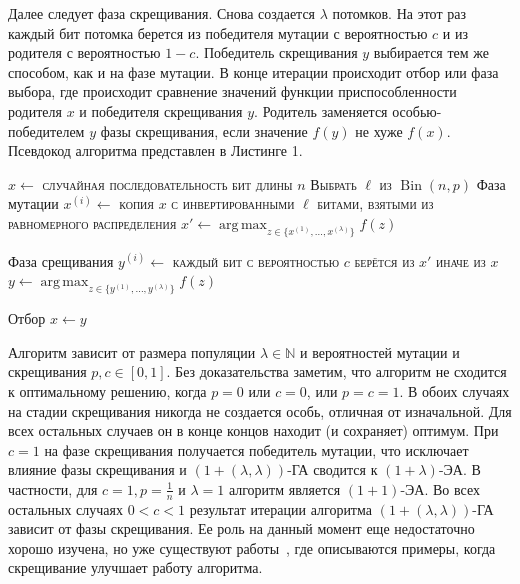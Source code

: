 \documentclass[times]{itmo-student-thesis}
\newcommand{\alglambdaf}{${(1 + (\lambda , \lambda))}$-ГА\xspace}
\newcommand{\oea}{\mbox{$(1 + 1)$-ЭА}\xspace}
\newcommand{\oplea}{\mbox{$(1+\lambda)$-ЭА}\xspace}
\newcommand{\N}{{\mathbb N}}
\DeclareMathOperator{\Bin}{Bin}
\DeclareMathOperator*{\argmax}{arg\,max}
\begin{document}
Далее следует фаза скрещивания. Снова создается $\lambda$ потомков. На этот раз каждый бит потомка берется из победителя мутации с вероятностью $c$ и из родителя с вероятностью $1 - c$. Победитель скрещивания $y$ выбирается тем же способом, как и на фазе мутации. В конце итерации происходит отбор или фаза выбора, где происходит сравнение значений функции приспособленности родителя $x$ и победителя скрещивания $y$.
Родитель заменяется особью-победителем $y$ фазы скрещивания, если значение $f(y)$ не хуже $f(x)$. Псевдокод алгоритма представлен в Листинге 1.

\begin{algorithm}[h]
\caption{Псевдокод \alglambdaf, максимизируещего $f$}\label{ollgaMin}
\begin{algorithmic}
	\State$x \gets $ \textsc{случайная последовательность бит длины} $n$
		\State \textsc{Выбрать} $\ell$ \textsc{из} $\Bin\left(n, p\right)$ \Comment Фаза мутации
         		\State$x^{(i)} \gets$ \textsc{копия} $x$ \textsc{с инвертированными} $\ell$ \textsc{битами, взятыми из равномерного распределения}
         	\EndFor
	     	\State $x' \gets \argmax_{z \in \{x^{(1)}, \dots, x^{(\lambda)}\}}f(z)$

		 \Comment Фаза срещивания
	          	\State $y^{(i)} \gets$ \textsc{каждый бит с вероятностью $c$ берётся из $x'$ иначе из $x$}
		\EndFor
	      	\State $y \gets \argmax_{z \in \{y^{(1)}, \dots, y^{(\lambda)}\} }f(z)$

		 \Comment Отбор
			\State $x \gets y$
		\EndIf
	\EndFor
\end{algorithmic}
\end{algorithm}

Алгоритм зависит от размера популяции $\lambda \in \N$ и вероятностей мутации и скрещивания $p, c \in [0, 1]$.
Без доказательства заметим, что алгоритм не сходится к оптимальному решению, когда $p = 0$ или $c = 0$, или $p = c = 1$. В обоих случаях на стадии скрещивания никогда не создается особь, отличная от изначальной.
Для всех остальных случаев он в конце концов находит (и сохраняет) оптимум.
При $c = 1$ на фазе скрещивания получается победитель мутации, что исключает влияние фазы скрещивания и \alglambdaf сводится к \oplea.
В частности, для $c = 1, p = \frac{1}{n}$ и $\lambda = 1$ алгоритм является \oea.
Во всех остальных случаях $0 < c < 1$ результат итерации алгоритма \alglambdaf зависит от фазы скрещивания.
Ее роль на данный момент еще недостаточно хорошо изучена, но уже существуют работы~\cite{Crossover2008, Dirk2014, Dang16, DoerrG09}, где описываются примеры, когда скрещивание улучшает работу алгоритма.
\end{document}
